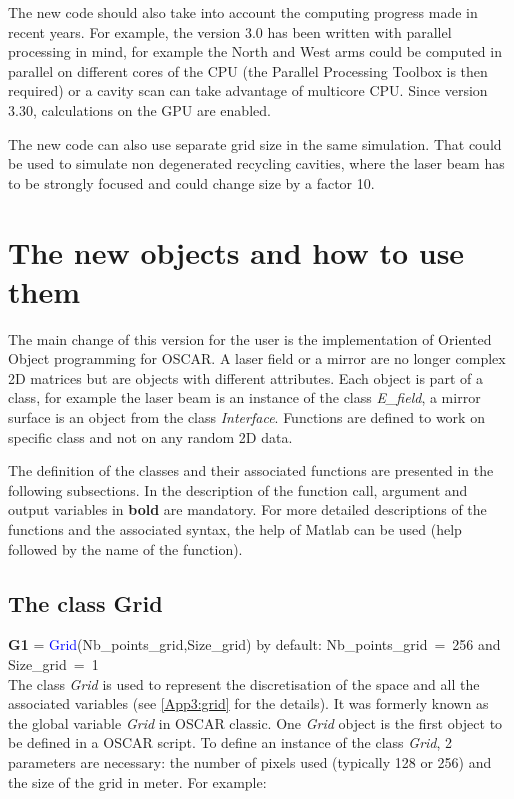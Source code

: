  The new code should also take into account the computing progress made in recent years. For example, the version 3.0 has been written with parallel processing in mind, for example the North and West arms could be computed in parallel on different cores of the CPU (the Parallel Processing Toolbox is then required) or a cavity scan can take advantage of multicore CPU. Since version 3.30, calculations on the GPU are enabled.

 The new code can also use separate grid size in the same simulation. That could be used to simulate non degenerated recycling cavities, where the laser beam has to be strongly focused and could change size by a factor 10.

\section{The new objects and how to use them}

The main change of this version for the user is the implementation of Oriented Object programming for OSCAR. A laser field or a mirror are no longer complex 2D matrices but are objects with different attributes. Each object is part of a class, for example the laser beam is an instance of the class \textsl{E\_field}, a mirror surface is an object from the class \textsl{Interface}. Functions are defined to work on specific class and not on any random 2D data.

The definition of the classes and their associated functions are presented in the following subsections. In the description of the function call, argument and output variables in \textbf{bold} are mandatory. For more detailed descriptions of the functions and the associated syntax, the help of Matlab can be used (help followed by the name of the function).

\subsection{The class Grid}

\textbf{G1} = \textcolor{blue}{Grid}(Nb\_points\_grid,Size\_grid)
by default: Nb\_points\_grid~=~256 and Size\_grid~=~1 \\

The class \textsl{Grid} is used to represent the discretisation of the space and all the associated variables (see \ref{App3:grid} for the details). It was formerly known as the global variable \textsl{Grid} in OSCAR classic. One \textsl{Grid} object is the first object to be defined in a OSCAR script. To define an instance of the class \textsl{Grid}, 2 parameters are necessary: the number of pixels used (typically 128 or 256) and the size of the grid in meter. For example:

